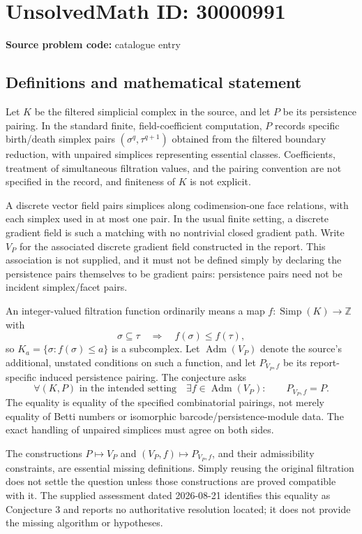 \documentclass[11pt]{article}
\newcommand{\Z}{\mathbb{Z}}
\begin{document}
\section*{UnsolvedMath ID: 30000991}
\textbf{Source problem code:} catalogue entry
\subsection{Definitions and mathematical statement}
Let \(K\) be the filtered simplicial complex in the source, and let \(P\) be its persistence pairing. In the standard finite, field-coefficient computation, \(P\) records specific birth/death simplex pairs \((\sigma^q,\tau^{q+1})\) obtained from the filtered boundary reduction, with unpaired simplices representing essential classes. Coefficients, treatment of simultaneous filtration values, and the pairing convention are not specified in the record, and finiteness of \(K\) is not explicit.

A discrete vector field pairs simplices along codimension-one face relations, with each simplex used in at most one pair. In the usual finite setting, a discrete gradient field is such a matching with no nontrivial closed gradient path. Write \(V_P\) for the associated discrete gradient field constructed in the report. This association is not supplied, and it must not be defined simply by declaring the persistence pairs themselves to be gradient pairs: persistence pairs need not be incident simplex/facet pairs.

An integer-valued filtration function ordinarily means a map \(f:\operatorname{Simp}(K)\to\Z\) with
\[
 \sigma\subseteq\tau\quad\Longrightarrow\quad f(\sigma)\leq f(\tau),
\]
so \(K_a=\{\sigma:f(\sigma)\leq a\}\) is a subcomplex. Let \(\operatorname{Adm}(V_P)\) denote the source's additional, unstated conditions on such a function, and let \(P_{V_P,f}\) be its report-specific induced persistence pairing. The conjecture asks
\[
 \forall(K,P)\text{ in the intended setting}\quad
 \exists f\in\operatorname{Adm}(V_P):\qquad P_{V_P,f}=P.
\]
The equality is equality of the specified combinatorial pairings, not merely equality of Betti numbers or isomorphic barcode/persistence-module data. The exact handling of unpaired simplices must agree on both sides.

The constructions \(P\mapsto V_P\) and \((V_P,f)\mapsto P_{V_P,f}\), and their admissibility constraints, are essential missing definitions. Simply reusing the original filtration does not settle the question unless those constructions are proved compatible with it. The supplied assessment dated 2026-08-21 identifies this equality as Conjecture 3 and reports no authoritative resolution located; it does not provide the missing algorithm or hypotheses.
\end{document}

